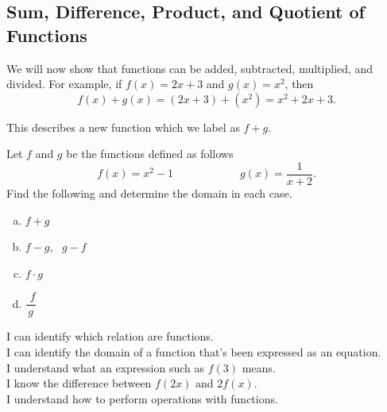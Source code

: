 \documentclass[oneside,10pt]{book}
\begin{document}
\newpage


\subsection{Sum, Difference, Product, and Quotient of Functions}

\example
We will now show that functions can be added, subtracted, multiplied, and
divided.
For example, if $f(x) = 2x+3$ and $g(x) = x^2 $, then
\[ f(x) + g(x) = (2x+3) + (x^2) = x^2 +2x + 3.\]

This describes a new function which we label as $f+g$.



\example
Let $f$ and $g$ be the functions defined as follows
\[ f(x) = x^2 -1 \hspace{1in} g(x) = \dfrac{1}{x+2}.\]
Find the following and determine the domain in each case.
\begin{enumerate}[(a)]
    \item
      $f+g$
    \item
      $f-g$, \, $g-f$
    \item
      $f\cdot g$
    \item
      $\dfrac{\phantom{i}f}{g}$
\end{enumerate}



\newpage



\begin{goals}
I can identify which relation are functions. \\
I can identify the domain of a function that's been expressed as an equation.\\
I understand what an expression such as $f(3)$ means. \\
I know the difference between $f(2x)$ and $2f(x)$. \\
I understand how to perform operations with functions. \\
\end{goals}
\end{document}
